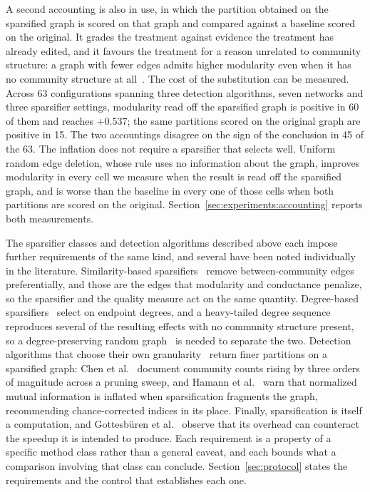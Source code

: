 A second accounting is also in use, in which the partition obtained on the
sparsified graph is scored on that graph and compared against a baseline scored
on the original. It grades the treatment against evidence the treatment has
already edited, and it favours the treatment for a reason unrelated to community
structure: a graph with fewer edges admits higher modularity even when it has no
community structure at
all~\cite{guimera2004modularity}. The cost of the substitution can be measured.
Across 63 configurations spanning three detection algorithms, seven networks and
three sparsifier settings, modularity read off the sparsified graph is positive
in 60 of them and reaches $+0.537$; the same partitions scored on the original
graph are positive in 15. The two accountings disagree on the sign of the
conclusion in 45 of the 63. The inflation does not require a sparsifier that
selects well. Uniform random edge deletion, whose rule uses no information about
the graph, improves modularity in every cell we measure when the result is read
off the sparsified graph, and is worse than the baseline in every one of those
cells when both partitions are scored on the original.
Section~\ref{sec:experiments:accounting} reports both measurements.

The sparsifier classes and detection algorithms described above each impose
further requirements of the same kind, and several have been noted individually
in the literature. Similarity-based sparsifiers~\cite{satuluri2011local} remove
between-community edges preferentially, and those are the edges that modularity
and conductance penalize, so the sparsifier and the quality measure act on the
same quantity. Degree-based sparsifiers~\cite{liu2023dspar} select on endpoint
degrees, and a heavy-tailed degree sequence reproduces several of the resulting
effects with no community structure present, so a degree-preserving random
graph~\cite{molloy1995critical} is needed to separate the two. Detection
algorithms that choose their own granularity~\cite{blondel2008fast,
traag2019louvain} return finer partitions on a sparsified graph: Chen et
al.~\cite{chen2024demystifying} document community counts rising by three orders
of magnitude across a pruning sweep, and Hamann et al.~\cite{hamann2016structure}
warn that normalized mutual information is inflated when sparsification
fragments the graph, recommending chance-corrected indices in its place. Finally,
sparsification is itself a computation, and Gottesb\"{u}ren et
al.~\cite{gottesburen2025linear} observe that its overhead can counteract the
speedup it is intended to produce. Each requirement is a property of a specific
method class rather than a general caveat, and each bounds what a comparison
involving that class can conclude. Section~\ref{sec:protocol} states the
requirements and the control that establishes each one.

